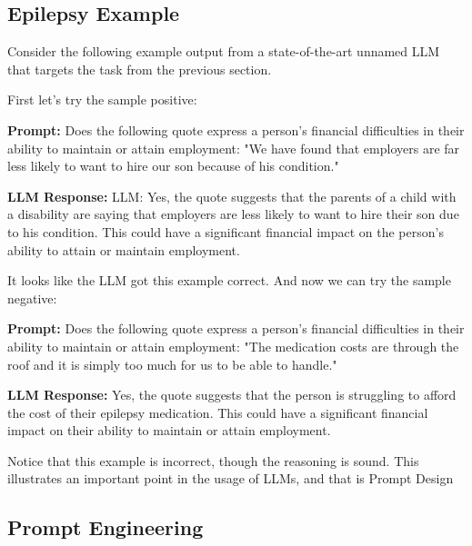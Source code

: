 \subsection{Epilepsy Example}

Consider the following example output from a state-of-the-art unnamed LLM that targets the task from the previous section.

First let's try the sample positive:

\begin{displayquote}
  \textbf{Prompt:} Does the following quote express a person's financial difficulties in their ability to maintain or attain employment: "We have found that employers are far less likely to want to hire our son because of his condition."
\end{displayquote}

\begin{displayquote}
  \textbf{LLM Response:} LLM: Yes, the quote suggests that the parents of a child with a disability are saying that employers are less likely to want to hire their son due to his condition. This could have a significant financial impact on the person's ability to attain or maintain employment.
\end{displayquote}

It looks like the LLM got this example correct. And now we can try the sample negative:

\begin{displayquote}
  \textbf{Prompt:} Does the following quote express a person's financial difficulties in their ability to maintain or attain employment: "The medication costs are through the roof and it is simply too much for us to be able to handle."
\end{displayquote}

\begin{displayquote}
  \textbf{LLM Response:} Yes, the quote suggests that the person is struggling to afford the cost of their epilepsy medication. This could have a significant financial impact on their ability to maintain or attain employment.
\end{displayquote}

Notice that this example is incorrect, though the reasoning is sound. This illustrates an important point in the usage of LLMs, and that is Prompt Design

\subsection{Prompt Engineering}

